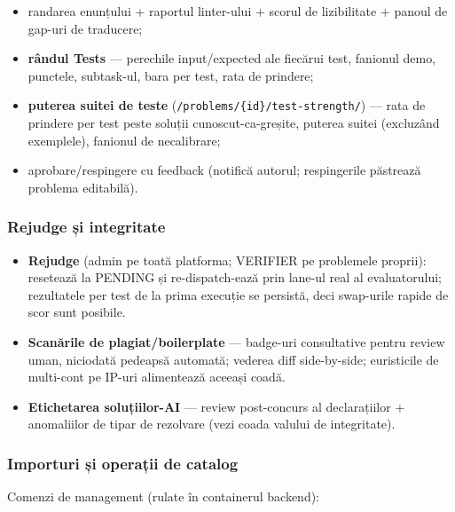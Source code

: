 \documentclass[
]{article}
\providecommand{\tightlist}{%
  \setlength{\itemsep}{0pt}\setlength{\parskip}{0pt}}
\begin{document}
\begin{itemize}
\tightlist
\item
  randarea enunțului + raportul linter-ului + scorul de lizibilitate +
  panoul de gap-uri de traducere;
\item
  \textbf{rândul Tests} --- perechile input/expected ale fiecărui test,
  fanionul demo, punctele, subtask-ul, bara per test, rata de prindere;
\item
  \textbf{puterea suitei de teste}
  (\texttt{/problems/\{id\}/test-strength/}) --- rata de prindere per
  test peste soluții cunoscut-ca-greșite, puterea suitei (excluzând
  exemplele), fanionul de necalibrare;
\item
  aprobare/respingere cu feedback (notifică autorul; respingerile
  păstrează problema editabilă).
\end{itemize}

\subsubsection{Rejudge și integritate}\label{rejudge-ux219i-integritate}

\begin{itemize}
\tightlist
\item
  \textbf{Rejudge} (admin pe toată platforma; VERIFIER pe problemele
  proprii): resetează la PENDING și re-dispatch-ează prin lane-ul real
  al evaluatorului; rezultatele per test de la prima execuție se
  persistă, deci swap-urile rapide de scor sunt posibile.
\item
  \textbf{Scanările de plagiat/boilerplate} --- badge-uri consultative
  pentru review uman, niciodată pedeapsă automată; vederea diff
  side-by-side; euristicile de multi-cont pe IP-uri alimentează aceeași
  coadă.
\item
  \textbf{Etichetarea soluțiilor-AI} --- review post-concurs al
  declarațiilor + anomaliilor de tipar de rezolvare (vezi coada valului
  de integritate).
\end{itemize}

\subsubsection{Importuri și operații de
catalog}\label{importuri-ux219i-operaux21bii-de-catalog}

Comenzi de management (rulate în containerul backend):
\end{document}

